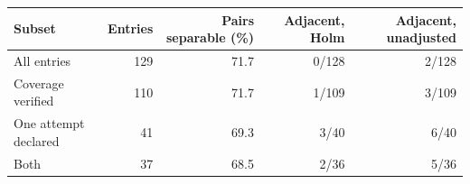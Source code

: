 \begin{tabular}{lrrrr}
\toprule
Subset & Entries & Pairs separable (\%) & Adjacent, Holm & Adjacent, unadjusted \\
\midrule
All entries & 129 & 71.7 & 0/128 & 2/128 \\
Coverage verified & 110 & 71.7 & 1/109 & 3/109 \\
One attempt declared & 41 & 69.3 & 3/40 & 6/40 \\
Both & 37 & 68.5 & 2/36 & 5/36 \\
\bottomrule
\end{tabular}
